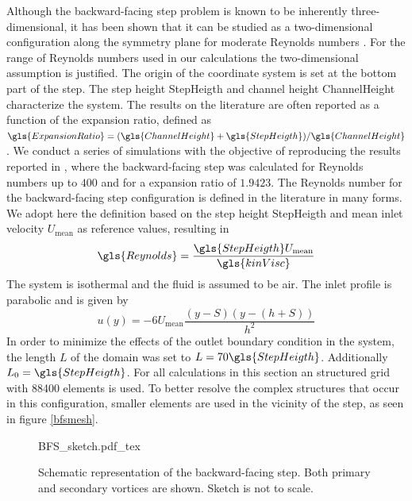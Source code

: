 Although the backward-facing step problem is known to be inherently three-dimensional, it has been shown that it can be studied as a two-dimensional configuration along the symmetry plane for moderate Reynolds numbers \citep{barkleyThreedimensionalInstabilityFlow2000, biswasBackwardFacingStepFlows2004}. For the range of Reynolds numbers used in our calculations the two-dimensional assumption is justified.  The origin of the coordinate system is set at the bottom part of the step. The step height \gls{StepHeigth} and channel height \gls{ChannelHeight} characterize the system. The results on the literature are often reported as a function of the expansion ratio, defined as $\gls{ExpansionRatio} = (\gls{ChannelHeight}+\gls{StepHeigth})/\gls{ChannelHeight}$. 
We conduct a series of simulations with the objective of reproducing the results reported in \cite{biswasBackwardFacingStepFlows2004}, where the backward-facing step was calculated for Reynolds numbers up to $400$ and for a expansion ratio of $1.9423$. 
The Reynolds number for the backward-facing step configuration is defined in the literature in many forms. We adopt here the definition based on the step height \gls{StepHeigth} and mean inlet velocity $U_{\text{mean}}$ as reference values, resulting in
\begin{equation}
\gls{Reynolds}= \frac{\gls{StepHeigth}U_{\text{mean}}}{\gls{kinVisc}}
\end{equation} 
The system is isothermal and the fluid is assumed to be air. The inlet profile is parabolic and is given by
\begin{equation}
u(y) = -6U_{\text{mean}}\frac{(y-S)(y-(h+S))}{h^2}
\end{equation}
In order to minimize the effects of the outlet  boundary condition in the system, the length $L$ of the domain was set to $L = 70 \gls{StepHeigth}$. Additionally  $L_0 = \gls{StepHeigth}$. For all calculations in this section an structured grid with 88400 elements is used. To better resolve the complex structures that occur in this configuration, smaller elements are used in the vicinity of the step, as seen in figure \cref{bfsmesh}.

\begin{figure}[tb]
	\begin{center}
		\def\svgwidth{0.9\textwidth}
		{BFS_sketch.pdf_tex}		
		\caption{Schematic representation of the backward-facing step. Both primary and secondary vortices are shown. Sketch is not to scale.}
		\label{BFSsketch}
	\end{center}	
\end{figure} 

